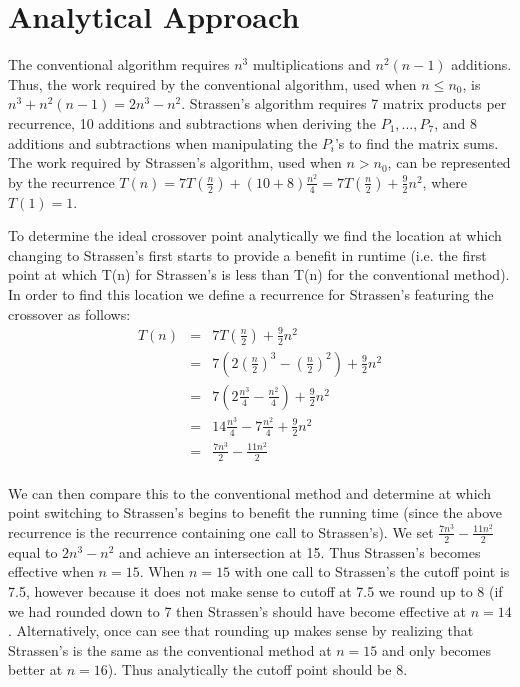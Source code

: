 \documentclass[solution, letterpaper]{cs121}
\begin{document}

\section*{Analytical Approach}

\hspace{4mm} The conventional algorithm requires $n^3$ multiplications and $n^2(n-1)$ additions. Thus, the work required by the conventional algorithm, used when $n \leq n_0$, is $n^3 + n^2(n-1) = 2n^3 - n^2$. Strassen's algorithm requires 7 matrix products per recurrence, 10 additions and subtractions when deriving the $P_1, \ldots, P_7$, and 8 additions and subtractions when manipulating the $P_i$'s to find the matrix sums. The work required by Strassen's algorithm, used when $n > n_0$, can be represented by the recurrence $T(n) = 7T(\frac{n}{2}) + (10+8)\frac{n^2}{4} = 7T(\frac{n}{2}) + \frac{9}{2}n^2$, where $T(1) = 1$.

To determine the ideal crossover point analytically we find the location at which changing to Strassen's first starts to provide a benefit in runtime (i.e. the first point at which T(n) for Strassen's is less than T(n) for the conventional method). In order to find this location we define a recurrence for Strassen's featuring the crossover as follows:
\[
\begin{array}{rcl}
T(n) &=& 7T(\frac{n}{2}) + \frac{9}{2}n^2\\
&=& 7(2(\frac{n}{2})^3 - (\frac{n}{2})^2) + \frac{9}{2}n^2\\
&=& 7(2\frac{n^3}{4} - \frac{n^2}{4}) + \frac{9}{2}n^2\\
&=& 14\frac{n^3}{4} - 7\frac{n^2}{4} + \frac{9}{2}n^2\\
&=& \frac{7n^3}{2} - \frac{11n^2}{2}\\
\end{array}
\]

We can then compare this to the conventional method and determine at which point switching to Strassen's begins to benefit the running time (since the above recurrence is the recurrence containing one call to Strassen's). We set $\frac{7n^3}{2} - \frac{11n^2}{2}$ equal to $2n^3 - n^2$ and achieve an intersection at 15. Thus Strassen's becomes effective when $n = 15$. When $n=15$ with one call to Strassen's the cutoff point is 7.5, however because it does not make sense to cutoff at 7.5 we round up to 8 (if we had rounded down to 7 then Strassen's should have become effective at $n = 14$. Alternatively, once can see that rounding up makes sense by realizing that Strassen's is the same as the conventional method at $n=15$ and only becomes better at $n = 16$). Thus analytically the cutoff point should be 8.
\end{document}
